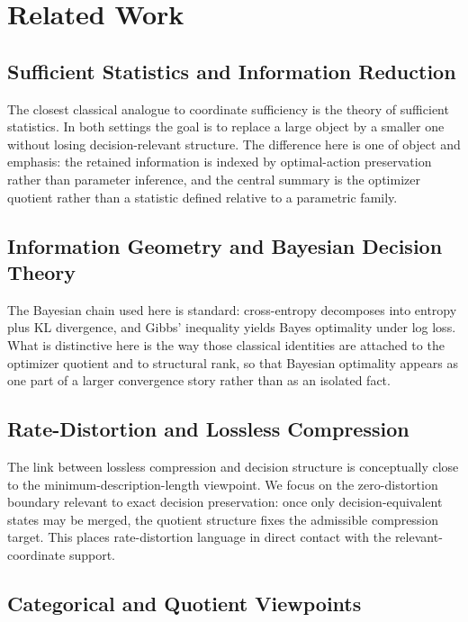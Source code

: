\section{Related Work}\label{sec:related}

\subsection{Sufficient Statistics and Information Reduction}

The closest classical analogue to coordinate sufficiency is the theory of sufficient statistics. In both settings the goal is to replace a large object by a smaller one without losing decision-relevant structure. The difference here is one of object and emphasis: the retained information is indexed by optimal-action preservation rather than parameter inference, and the central summary is the optimizer quotient rather than a statistic defined relative to a parametric family.

\subsection{Information Geometry and Bayesian Decision Theory}

The Bayesian chain used here is standard: cross-entropy decomposes into entropy plus KL divergence, and Gibbs' inequality yields Bayes optimality under log loss. What is distinctive here is the way those classical identities are attached to the optimizer quotient and to structural rank, so that Bayesian optimality appears as one part of a larger convergence story rather than as an isolated fact.

\subsection{Rate-Distortion and Lossless Compression}

The link between lossless compression and decision structure is conceptually close to the minimum-description-length viewpoint. We focus on the zero-distortion boundary relevant to exact decision preservation: once only decision-equivalent states may be merged, the quotient structure fixes the admissible compression target. This places rate-distortion language in direct contact with the relevant-coordinate support.

\subsection{Categorical and Quotient Viewpoints}

